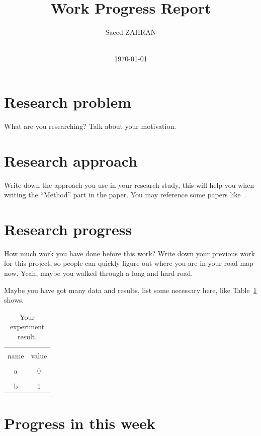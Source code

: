 \documentclass[a4paper]{article}
\title{
    \vspace*{1in}
    \vspace*{1.2in}
    \textbf{\huge Work Progress Report}
    \vspace{0.2in}
}
\author{Saeed ZAHRAN \\
    \vspace*{0.5in} \\
    \vspace*{1in}
}
\date{\today}
\begin{document}
\maketitle
\setcounter{page}{0}
\thispagestyle{empty}
\newpage


\section{Research problem}

What are you researching? Talk about your motivation.

\section{Research approach}

Write down the approach you use in your research study, this will help you when writing the ``Method'' part in the paper. You may reference some papers like~\cite{isola2017image}.


\section{Research progress}

How much work you have done before this work? Write down your previous work for this project, so people can quickly figure out where you are in your road map now. Yeah, maybe you walked through a long and hard road.

Maybe you have got many data and results, list some necessary here, like Table~\ref{tab:result} shows.

\begin{table}[hb]
    \centering
    \begin{tabular}{c|c}
        \hline \\
        name & value \\
        \hline \\
        a & 0 \\
        \hline \\
        b & 1 \\
        \hline
    \end{tabular}
    \caption{Your experiment result.}
    \label{tab:result}
\end{table}


\section{Progress in this week}
\end{document}
